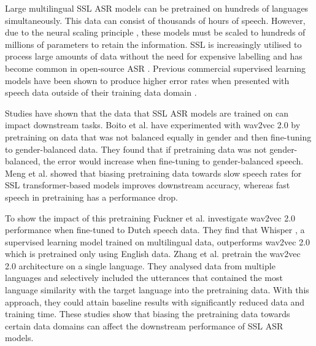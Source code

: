 Large multilingual SSL ASR models can be pretrained on hundreds of languages simultaneously. This data can consist of thousands of hours of speech. However, due to the neural scaling principle \cite{zhang2022bigssl, pu21_interspeech}, these models must be scaled to hundreds of millions of parameters to retain the information. SSL is increasingly utilised to process large amounts of data without the need for expensive labelling and has become common in open-source ASR \cite{wav2vec, hsu2021hubert, chen2022wavlm}. Previous commercial supervised learning models have been shown to produce higher error rates when presented with speech data outside of their training data domain \cite{koenecke2020racial, towards_inclusive}. 

Studies have shown that the data that SSL ASR models are trained on can impact downstream tasks. Boito et al. \cite{sslbias_gender} have experimented with wav2vec 2.0 by pretraining on data that was not balanced equally in gender and then fine-tuning to gender-balanced data. They found that if pretraining data was not gender-balanced, the error would increase when fine-tuning to gender-balanced speech. Meng et al. \cite{sslbias_speechrate} showed that biasing pretraining data towards slow speech rates for SSL transformer-based models improves downstream accuracy, whereas fast speech in pretraining has a performance drop. 

To show the impact of this pretraining Fuckner et al. \cite{sslbias_Dutch} investigate wav2vec 2.0 performance when fine-tuned to Dutch speech data. They find that Whisper \cite{whisper}, a supervised learning model trained on multilingual data, outperforms wav2vec 2.0 \cite{wav2vec} which is pretrained only using English data. Zhang et al. \cite{zhang2023fast} pretrain the wav2vec 2.0 architecture on a single language. They analysed data from multiple languages and selectively included the utterances that contained the most language similarity with the target language into the pretraining data. With this approach, they could attain baseline results with significantly reduced data and training time. These studies show that biasing the pretraining data towards certain data domains can affect the downstream performance of SSL ASR models.

